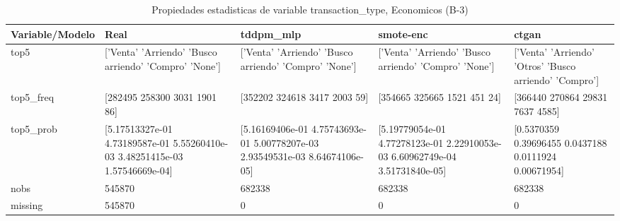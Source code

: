 \begin{table}[H]
\centering
\fontsize{8}{14}\selectfont
\caption{Propiedades  estadisticas de variable transaction\_type, Economicos (B-3)}
\label{table-stats-economicos-b-3-transaction_type}
\begin{tabular}{|l|m{10em}|m{10em}|m{10em}|m{10em}|}
\hline
 \rowcolor[gray]{0.8}
Variable/Modelo & Real & tddpm\_mlp & smote-enc & ctgan \\
\hline top5 & ['Venta' 'Arriendo' 'Busco arriendo' 'Compro' 'None'] & ['Venta' 'Arriendo' 'Busco arriendo' 'Compro' 'None'] & ['Venta' 'Arriendo' 'Busco arriendo' 'Compro' 'None'] & ['Venta' 'Arriendo' 'Otros' 'Busco arriendo' 'Compro'] \\
\hline top5\_freq & [282495 258300   3031   1901     86] & [352202 324618   3417   2003     59] & [354665 325665   1521    451     24] & [366440 270864  29831   7637   4585] \\
\hline top5\_prob & [5.17513327e-01 4.73189587e-01 5.55260410e-03 3.48251415e-03
 1.57546669e-04] & [5.16169406e-01 4.75743693e-01 5.00778207e-03 2.93549531e-03
 8.64674106e-05] & [5.19779054e-01 4.77278123e-01 2.22910053e-03 6.60962749e-04
 3.51731840e-05] & [0.5370359  0.39696455 0.0437188  0.0111924  0.00671954] \\
\hline nobs & 545870 & 682338 & 682338 & 682338 \\
\hline missing & 545870 & 0 & 0 & 0 \\
\hline
\end{tabular}
\end{table}
